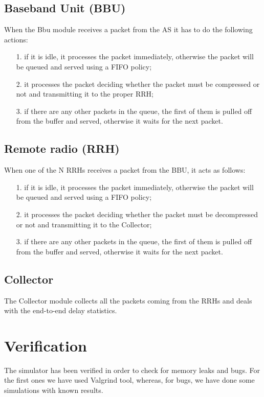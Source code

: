 \documentclass[11pt,a4paper,oneside, openright]{article}
\begin{document}
\subsection{Baseband Unit (BBU)}
When the Bbu module receives a packet from the AS it has to do the following actions:
\begin{itemize}
    \item[1.] if it is idle, it processes the packet immediately, otherwise the packet will be queued and served using a FIFO policy;
    \item[2.] it processes the packet deciding whether the packet must be compressed or not and transmitting it to the proper RRH;
    \item[3.] if there are any other packets in the queue, the first of them is pulled off from the buffer and served, otherwise it waits for the next packet.
\end{itemize}

\subsection{Remote radio (RRH)}
When one of the N RRHs receives a packet from the BBU, it acts as follows:
\begin{itemize}
    \item[1.] if it is idle, it processes the packet immediately, otherwise the packet will be queued and served using a FIFO policy;
    \item[2.] it processes the packet deciding whether the packet must be decompressed or not and transmitting it to the Collector;
    \item[3.] if there are any other packets in the queue, the first of them is pulled off from the buffer and served, otherwise it waits for the next packet.
\end{itemize}


\subsection{Collector}
The Collector module collects all the packets coming from the RRHs and deals with the end-to-end delay statistics.

\section{Verification}
The simulator has been verified in order to check for memory leaks and bugs.
For the first ones we have used Valgrind tool, whereas, for bugs, we have done some simulations with known results.
\end{document}
